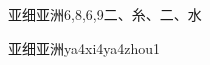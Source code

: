 \begin{entry}{亚细亚洲}{6,8,6,9}{⼆、⽷、⼆、⽔}
  \begin{phonetics}{亚细亚洲}{ya4xi4ya4zhou1}
  \end{phonetics}
\end{entry}
